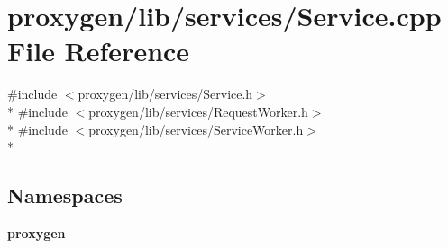 \section{proxygen/lib/services/\+Service.cpp File Reference}
\label{Service_8cpp}
{\ttfamily \#include $<$proxygen/lib/services/\+Service.\+h$>$}\\*
{\ttfamily \#include $<$proxygen/lib/services/\+Request\+Worker.\+h$>$}\\*
{\ttfamily \#include $<$proxygen/lib/services/\+Service\+Worker.\+h$>$}\\*
\subsection*{Namespaces}
\begin{DoxyCompactItemize}
\item 
 {\bf proxygen}
\end{DoxyCompactItemize}
